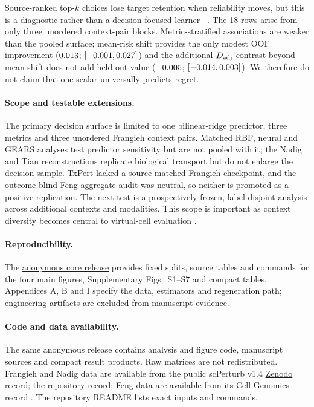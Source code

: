 \documentclass{article}
\begin{document}
Source-ranked top-$k$ choices lose target retention when reliability moves, but
this is a diagnostic rather than a decision-focused learner
~\citep{donti2017task,wilder2019melding,elmachtoub2022smart}. The 18 rows arise
from only three unordered context-pair blocks. Metric-stratified associations
are weaker than the pooled surface; mean-risk shift provides the only modest OOF improvement
($0.013$; $[-0.001, 0.027]$) and the
additional $D_{\rm adj}$ contrast beyond mean shift does not add held-out value
($-0.005$;
$[-0.014, 0.003]$). We therefore do not claim that one
scalar universally predicts regret.

\paragraph{Scope and testable extensions.}
The primary decision surface is limited to one bilinear-ridge predictor, three
metrics and three unordered Frangieh context pairs. Matched RBF, neural and
GEARS analyses test predictor sensitivity but are not pooled with it; the Nadig
and Tian reconstructions replicate biological transport but do not enlarge the
decision sample. TxPert lacked a source-matched Frangieh checkpoint, and the
outcome-blind Feng aggregate audit was neutral, so neither is promoted as a
positive replication. The next test is a prospectively frozen, label-disjoint
analysis across additional contexts and modalities. This scope is important as
context diversity becomes central to virtual-cell evaluation
\citep{dibaeinia2026context}.

\paragraph{Reproducibility.}
The \href{https://anonymous.4open.science/r/PTL-B377/}{anonymous core release}
provides fixed splits, source tables and commands for the four main figures,
Supplementary Figs.~S1--S7 and compact tables. Appendices A, B and I specify the
data, estimators and regeneration path; engineering artifacts are excluded from
manuscript evidence.

\paragraph{Code and data availability.}
The same anonymous release contains analysis and figure code, manuscript
sources and compact result products. Raw matrices are not redistributed.
Frangieh and Nadig data are available from the public scPerturb v1.4
\href{https://zenodo.org/records/13350497}{Zenodo record}; the repository
record; Feng data are available from its Cell Genomics record
\citep{feng2026crispri}. The repository README lists exact inputs and commands.
\end{document}
